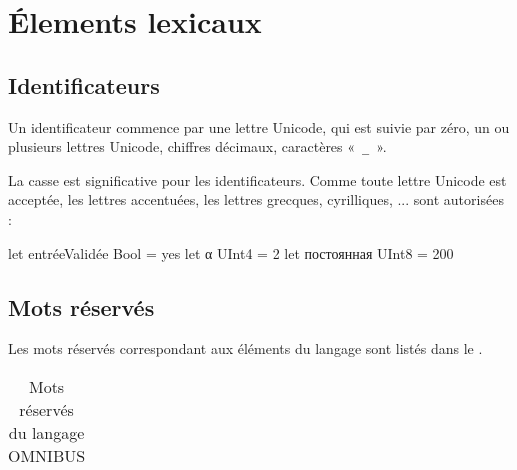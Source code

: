 


\chapter{Élements lexicaux}

\thispagestyle{empty}





\section{Identificateurs}
Un identificateur commence par une lettre Unicode, qui est suivie par zéro, un ou plusieurs lettres Unicode, chiffres décimaux, caractères «~\texttt{\_}~».

La casse est significative pour les identificateurs. Comme toute lettre Unicode est acceptée, les lettres accentuées, les lettres grecques, cyrilliques, ... sont autorisées :

\begin{OMNIBUS}
let entréeValidée Bool = yes
let α UInt4 = 2
let постоянная UInt8 = 200
\end{OMNIBUS}



\section{Mots réservés}

%

Les mots réservés correspondant aux éléments du langage sont listés dans le .

\begin{table}[htbp]
  \centering
  \begin{tabular}{llllll}
    
  \end{tabular}
  \caption{Mots réservés du langage OMNIBUS}
\end{table}




%






